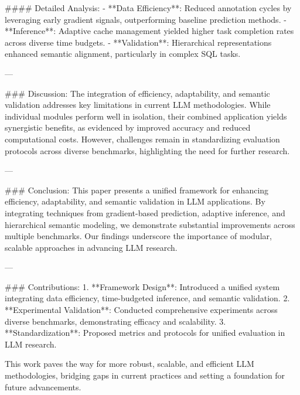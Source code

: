 #### Detailed Analysis:
- **Data Efficiency**: Reduced annotation cycles by leveraging early gradient signals, outperforming baseline prediction methods.
- **Inference**: Adaptive cache management yielded higher task completion rates across diverse time budgets.
- **Validation**: Hierarchical representations enhanced semantic alignment, particularly in complex SQL tasks.

---

### Discussion:
The integration of efficiency, adaptability, and semantic validation addresses key limitations in current LLM methodologies. While individual modules perform well in isolation, their combined application yields synergistic benefits, as evidenced by improved accuracy and reduced computational costs. However, challenges remain in standardizing evaluation protocols across diverse benchmarks, highlighting the need for further research.

---

### Conclusion:
This paper presents a unified framework for enhancing efficiency, adaptability, and semantic validation in LLM applications. By integrating techniques from gradient-based prediction, adaptive inference, and hierarchical semantic modeling, we demonstrate substantial improvements across multiple benchmarks. Our findings underscore the importance of modular, scalable approaches in advancing LLM research.

---

### Contributions:
1. **Framework Design**: Introduced a unified system integrating data efficiency, time-budgeted inference, and semantic validation.
2. **Experimental Validation**: Conducted comprehensive experiments across diverse benchmarks, demonstrating efficacy and scalability.
3. **Standardization**: Proposed metrics and protocols for unified evaluation in LLM research.

This work paves the way for more robust, scalable, and efficient LLM methodologies, bridging gaps in current practices and setting a foundation for future advancements.